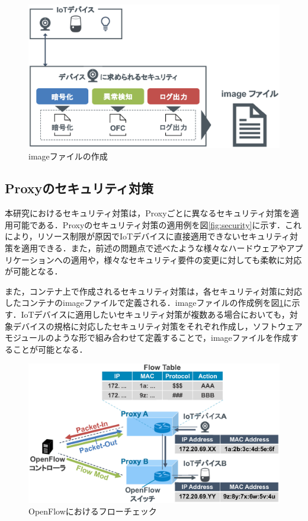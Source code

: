 \documentclass[Japanese]{dicomopapers}
\begin{document}
\begin{figure}[!tb]
	\centering
	\includegraphics[width=\linewidth]{img/dockerimage.eps}
	\caption{imageファイルの作成}
	\label{fig:dockerimage}
\end{figure}

\subsection{Proxyのセキュリティ対策}
本研究におけるセキュリティ対策は，Proxyごとに異なるセキュリティ対策を適用可能である．Proxyのセキュリティ対策の適用例を図\ref{fig:security}に示す．これにより，リソース制限が原因でIoTデバイスに直接適用できないセキュリティ対策を適用できる．また，前述の問題点で述べたような様々なハードウェアやアプリケーションへの適用や，様々なセキュリティ要件の変更に対しても柔軟に対応が可能となる．\par
また，コンテナ上で作成されるセキュリティ対策は，各セキュリティ対策に対応したコンテナのimageファイルで定義される．imageファイルの作成例を図\ref{fig:dockerimage}に示す．IoTデバイスに適用したいセキュリティ対策が複数ある場合においても，対象デバイスの規格に対応したセキュリティ対策をそれぞれ作成し，ソフトウェアモジュールのような形で組み合わせて定義することで，imageファイルを作成することが可能となる．

\begin{figure}[!tb]
	\centering
	\includegraphics[width=\linewidth]{img/openflow.eps}
	\caption{OpenFlowにおけるフローチェック}
	\label{fig:openflow}
\end{figure}
\end{document}
